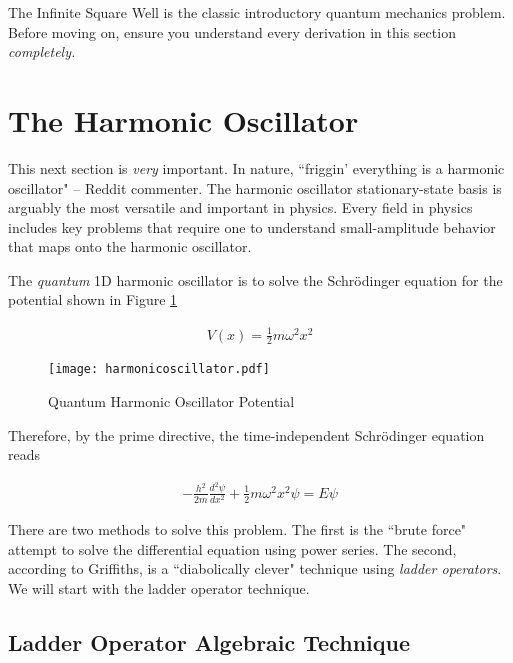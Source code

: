 The Infinite Square Well is the classic introductory quantum mechanics problem.
Before moving on, ensure you understand every derivation in this section
\textit{completely.} 

\section{The Harmonic Oscillator}

This next section is \textit{very} important. In nature, ``friggin' everything is
a harmonic oscillator" -- Reddit commenter. The harmonic oscillator stationary-state basis is
arguably the most versatile and important in physics. Every field in physics
includes key problems that require one to understand small-amplitude behavior
that maps onto the harmonic oscillator. 

The \textit{quantum} 1D harmonic oscillator is to solve the Schr\"odinger
equation for the potential shown in Figure \ref{fig:harmonicoscillator}

\begin{align} \label{HOpotential}
  V(x) = \frac{1}{2}m\omega^2 x^2
\end{align}\vspace{3px}

\begin{figure}[!ht]
  \centering
    \texttt{[image: harmonicoscillator.pdf]}
    \caption{Quantum Harmonic Oscillator Potential}
    \label{fig:harmonicoscillator}
\end{figure}

Therefore, by the prime directive, the time-independent Schr\"odinger equation
reads

\begin{align} \label{HOschr}
  -\frac{h^2}{2m} \frac{d^2 \psi}{d x^2} + \frac{1}{2}m\omega^2 x^2 \psi
  = E\psi
\end{align}\vspace{3px}

There are two methods to solve this problem. The first is the ``brute force"
attempt to solve the differential equation using power series. The second,
according to Griffiths, is a ``diabolically clever" technique using
\textit{ladder operators}. We will start with the ladder operator technique. 

\subsection{Ladder Operator Algebraic Technique}

